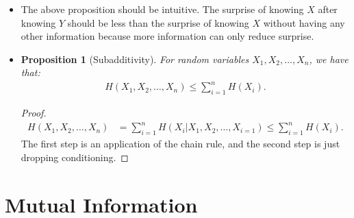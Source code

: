 \documentclass[10pt]{article}
\newtheorem{proposition}[lemma]{Proposition}
\begin{document}
\begin{itemize}
  	\begin{proof}
  		We will prove only the first inequality. The second is very similar. We have that:
  		\begin{align*}
  			H(X|Y)
  			&= \sum_y p(y) \bigg( \sum_x p(x|y) \log \frac{1}{p(x|y)} \bigg) \\
  			&= \sum_y \sum_x p(y) p(x|y) \log \frac{1}{p(x|y)} \\
  			&= \sum_x \sum_y p(x) p(y|x) \log \frac{1}{p(x|y)} \\
  			&= \sum_x p(x) \bigg( \sum_y  p(y|x) \log \frac{1}{p(x|y)} \bigg) \\
  			&\leq \sum_x p(x) \log \bigg( \sum_y \frac{p(y|x)}{p(x|y)} \bigg) \\
  			&= \sum_x p(x) \log \bigg( \sum_y \frac{p(x,y)}{p(x)} \frac{p(y)}{p(x,y)} \bigg) \\
  			&= \sum_x p(x) \log \bigg( \sum_y \frac{p(y)}{p(x)} \bigg) \\
  			&= \sum_x p(x) \log \frac{1}{p(x)} \\
  			&= H(X).
  		\end{align*}
  	\end{proof}

  	\item The above proposition should be intuitive. The surprise of knowing $X$ after knowing $Y$ should be less than the surprise of knowing $X$ without having any other information because more information can only reduce surprise.

  	\item \begin{proposition}[Subadditivity]
  		For random variables $X_1, X_2, \dotsc, X_n$, we have that:
  		\begin{align*}
  			H(X_1, X_2, \dotsc, X_n) \leq \sum_{i=1}^n H(X_i).
  		\end{align*}
  	\end{proposition}

  	\begin{proof}
  		\begin{align*}
  			H(X_1, X_2, \dotsc, X_n)
  			&= \sum_{i=1}^n H(X_i | X_1, X_2, \dotsc, X_{i=1})
  			\leq \sum_{i=1}^n H(X_i).
  		\end{align*}
  		The first step is an application of the chain rule, and the second step is just dropping conditioning.
  	\end{proof}
  \end{itemize}

  \section{Mutual Information}
\end{document}
